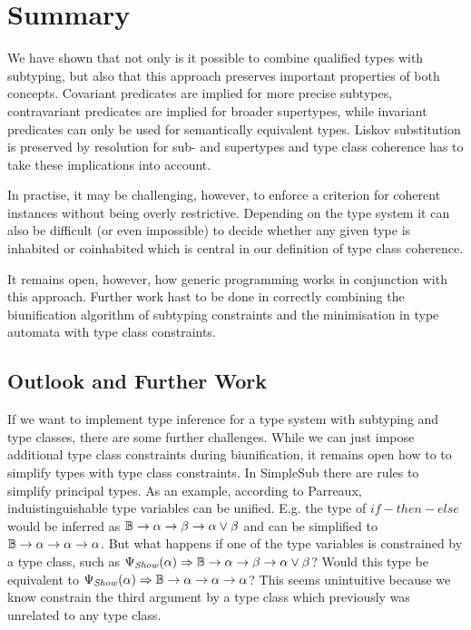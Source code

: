 
\chapter{Summary}
\label{ch:summary}

We have shown that not only is it possible to combine qualified types with subtyping, but also that this approach preserves important properties of both concepts.
Covariant predicates are implied for more precise subtypes, contravariant predicates are implied for broader supertypes, while invariant predicates can only be used for semantically equivalent types.
Liskov substitution is preserved by resolution for sub- and supertypes and type class coherence has to take these implications into account.

In practise, it may be challenging, however, to enforce a criterion for coherent instances without being overly restrictive.
Depending on the type system it can also be difficult (or even impossible) to decide whether any given type is inhabited or coinhabited which is central in our definition of type class coherence.

It remains open, however, how generic  programming works in conjunction with this approach.
Further work hast to be done in correctly combining the biunification algorithm of subtyping constraints and the minimisation in type automata with type class constraints.


\section{Outlook and Further Work}

If we want to implement type inference for a type system with subtyping and type classes, there are some further challenges.
While we can just impose additional type class constraints during biunification, it remains open how to to simplify types with type class constraints.
In SimpleSub \cite{10.1145/3409006} there are rules to simplify principal types.
As an example, according to Parreaux, induistinguishable type variables can be unified.
E.g. the type of $\mathit{if-then-else}$ would be inferred as $\mathbb{B} \to \alpha \to \beta \to \alpha \vee \beta$ and can be simplified to $\mathbb{B} \to \alpha \to \alpha \to \alpha$.
But what happens if one of the type variables is constrained by a type class, such as $\Psi_\mathit{Show}(\alpha) \Rightarrow \mathbb{B} \to \alpha \to \beta \to \alpha \vee \beta$?
Would this type be equivalent to $\Psi_\mathit{Show}(\alpha) \Rightarrow \mathbb{B} \to \alpha \to \alpha \to \alpha$?
This seems unintuitive because we know constrain the third argument by a type class which previously was unrelated to any type class.
\clearpage
